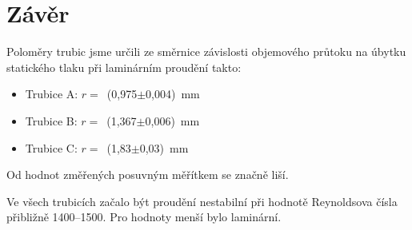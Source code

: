 \section*{Závěr}

Poloměry trubic jsme určili ze směrnice závislosti objemového průtoku na úbytku statického tlaku při laminárním proudění takto:

\begin{itemize}
\item Trubice A: $r=$~(0,975$\pm$0,004)~mm 
\item Trubice B: $r=$~(1,367$\pm$0,006)~mm
\item Trubice C: $r=$~(1,83$\pm$0,03)~mm
\end{itemize}

Od hodnot změřených posuvným měřítkem se značně liší.

Ve všech trubicích začalo být proudění nestabilní při hodnotě Reynoldsova čísla přibližně 1400--1500. Pro hodnoty menší bylo laminární.